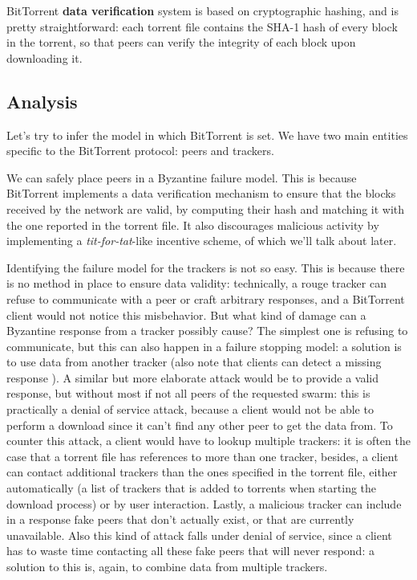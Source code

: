 \documentclass[mscthesis]{usiinfthesis}
\begin{document}
BitTorrent \textbf{data verification} system is based on cryptographic hashing, and is pretty straightforward: each torrent file contains the SHA-1 hash of every block in the torrent, so that peers can verify the integrity of each block upon downloading it.

\subsection{Analysis}

Let's try to infer the model in which BitTorrent is set. We have two main entities specific to the BitTorrent protocol: peers and trackers. 

We can safely place peers in a Byzantine failure model. This is because BitTorrent implements a data verification mechanism to ensure that the blocks received by the network are valid, by computing their hash and matching it with the one reported in the torrent file. It also discourages malicious activity by implementing a \textit{tit-for-tat}-like incentive scheme, of which we'll talk about later.

Identifying the failure model for the trackers is not so easy. This is because there is no method in place to ensure data validity: technically, a rouge tracker can refuse to communicate with a peer or craft arbitrary responses, and a BitTorrent client would not notice this misbehavior. But what kind of damage can a Byzantine response from a tracker possibly cause? The simplest one is refusing to communicate, but this can also happen in a failure stopping model: a solution is to use data from another tracker (also note that clients can detect a missing response ). A similar but more elaborate attack would be to provide a valid response, but without most if not all peers of the requested swarm: this is practically a denial of service attack, because a client would not be able to perform a download since it can't find any other peer to get the data from. To counter this attack, a client would have to lookup multiple trackers: it is often the case that a torrent file has references to more than one tracker, besides, a client can contact additional trackers than the ones specified in the torrent file, either automatically (a list of trackers that is added to torrents when starting the download process) or by user interaction. Lastly, a malicious tracker can include in a response fake peers that don't actually exist, or that are currently unavailable. Also this kind of attack falls under denial of service, since a client has to waste time contacting all these fake peers that will never respond: a solution to this is, again, to combine data from multiple trackers.
\end{document}
